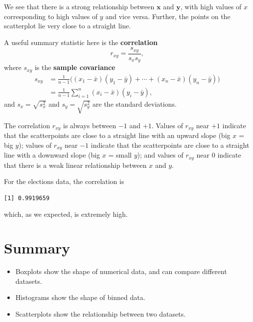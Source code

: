 \documentclass[
  a4paper,
]{book}
\newenvironment{Shaded}{\begin{snugshade}}{\end{snugshade}}
\newcommand{\FunctionTok}[1]{\textcolor[rgb]{0.00,0.00,0.00}{#1}}
\newcommand{\NormalTok}[1]{#1}
\newcommand{\SpecialCharTok}[1]{\textcolor[rgb]{0.00,0.00,0.00}{#1}}
\providecommand{\tightlist}{%
  \setlength{\itemsep}{0pt}\setlength{\parskip}{0pt}}
\theoremstyle{definition}
\theoremstyle{definition}
\theoremstyle{definition}
\theoremstyle{definition}
\theoremstyle{remark}
\begin{document}
We see that there is a strong relationship between \(\mathbf x\) and \(\mathbf y\), with high values of \(x\) corresponding to high values of \(y\) and vice versa. Further, the points on the scatterplot lie very close to a straight line.

A useful summary statistic here is the \textbf{correlation}
\[ r_{xy} = \frac{s_{xy}}{s_x s_y} , \]
where \(s_{xy}\) is the \textbf{sample covariance}
\begin{align*}
s_{xy} &= \frac{1}{n-1} \big( (x_1 - \bar x)(y_1 - \bar y) + \cdots + (x_n - \bar x)(y_n - \bar y) \big) \\
  &= \frac{1}{n-1} \sum_{i=1}^n (x_i - \bar x)(y_i - \bar y) ,
\end{align*}
and \(s_x = \sqrt{s_x^2}\) and \(s_y = \sqrt{s_y^2}\) are the standard deviations.

The correlation \(r_{xy}\) is always between \(-1\) and \(+1\). Values of \(r_{xy}\) near \(+1\) indicate that the scatterpoints are close to a straight line with an upward slope (big \(x\) = big \(y\)); values of \(r_{xy}\) near \(-1\) indicate that the scatterpoints are close to a straight line with a downward slope (big \(x\) = small \(y\)); and values of \(r_{xy}\) near 0 indicate that there is a weak linear relationship between \(x\) and \(y\).

For the elections data, the correlation is

\begin{Shaded}
\end{Shaded}

\begin{verbatim}
[1] 0.9919659
\end{verbatim}

which, as we expected, is extremely high.

\hypertarget{summary-02}{%
\section*{Summary}\label{summary-02}}

\begin{itemize}
\tightlist
\item
  Boxplots show the shape of numerical data, and can compare different datasets.
\item
  Histograms show the shape of binned data.
\item
  Scatterplots show the relationship between two datasets.
\end{itemize}
\end{document}
